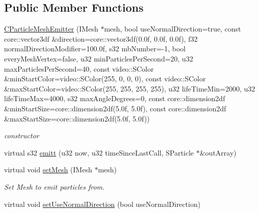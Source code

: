\subsection*{Public Member Functions}
\begin{DoxyCompactItemize}
\item 
\hypertarget{classirr_1_1scene_1_1_c_particle_mesh_emitter_a5310422956b37e9de086ed34b857fc73}{\hyperlink{classirr_1_1scene_1_1_c_particle_mesh_emitter_a5310422956b37e9de086ed34b857fc73}{C\-Particle\-Mesh\-Emitter} (I\-Mesh $\ast$mesh, bool use\-Normal\-Direction=true, const core\-::vector3df \&direction=core\-::vector3df(0.\-0f, 0.\-0f, 0.\-0f), f32 normal\-Direction\-Modifier=100.\-0f, s32 mb\-Number=-\/1, bool every\-Mesh\-Vertex=false, u32 min\-Particles\-Per\-Second=20, u32 max\-Particles\-Per\-Second=40, const video\-::\-S\-Color \&min\-Start\-Color=video\-::\-S\-Color(255, 0, 0, 0), const video\-::\-S\-Color \&max\-Start\-Color=video\-::\-S\-Color(255, 255, 255, 255), u32 life\-Time\-Min=2000, u32 life\-Time\-Max=4000, s32 max\-Angle\-Degrees=0, const core\-::dimension2df \&min\-Start\-Size=core\-::dimension2df(5.\-0f, 5.\-0f), const core\-::dimension2df \&max\-Start\-Size=core\-::dimension2df(5.\-0f, 5.\-0f))}\label{classirr_1_1scene_1_1_c_particle_mesh_emitter_a5310422956b37e9de086ed34b857fc73}

\begin{DoxyCompactList}\small\item\em constructor \end{DoxyCompactList}\item 
virtual s32 \hyperlink{classirr_1_1scene_1_1_c_particle_mesh_emitter_a75eefdb4bab711202bdd359b85d65672}{emitt} (u32 now, u32 time\-Since\-Last\-Call, S\-Particle $\ast$\&out\-Array)
\item 
\hypertarget{classirr_1_1scene_1_1_c_particle_mesh_emitter_a6a85fca77f364fb0a77c1c64eb4a32dd}{virtual void \hyperlink{classirr_1_1scene_1_1_c_particle_mesh_emitter_a6a85fca77f364fb0a77c1c64eb4a32dd}{set\-Mesh} (I\-Mesh $\ast$mesh)}\label{classirr_1_1scene_1_1_c_particle_mesh_emitter_a6a85fca77f364fb0a77c1c64eb4a32dd}

\begin{DoxyCompactList}\small\item\em Set Mesh to emit particles from. \end{DoxyCompactList}\item 
\hypertarget{classirr_1_1scene_1_1_c_particle_mesh_emitter_ac3313c21a45a505ba005a1cfb3863a38}{virtual void \hyperlink{classirr_1_1scene_1_1_c_particle_mesh_emitter_ac3313c21a45a505ba005a1cfb3863a38}{set\-Use\-Normal\-Direction} (bool use\-Normal\-Direction)}\label{classirr_1_1scene_1_1_c_particle_mesh_emitter_ac3313c21a45a505ba005a1cfb3863a38}


\end{DoxyCompactItemize}
